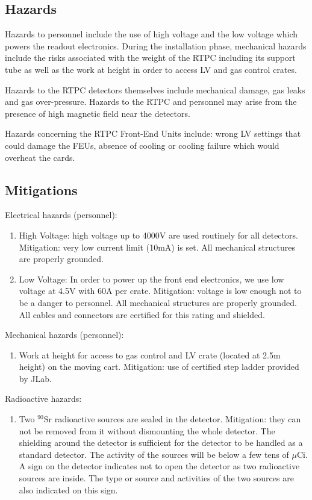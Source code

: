 \subsection{Hazards} 

Hazards to personnel include the use of high voltage and the low voltage which powers the readout electronics. During the installation phase, mechanical hazards include the risks associated with the weight of the RTPC including its support tube as well as the work at height in order to access LV and gas control crates.

Hazards to the RTPC detectors themselves include mechanical damage, gas leaks and gas over-pressure. Hazards to the RTPC and personnel may arise from the presence of high magnetic field near the detectors.

Hazards concerning the RTPC Front-End Units include: wrong LV settings that could damage the FEUs, absence of cooling or cooling failure which would overheat the cards.

\subsection{Mitigations}

Electrical hazards (personnel):

\begin{enumerate}
\item High Voltage: high voltage up to 4000V are used routinely for all detectors. Mitigation: very low current limit (10mA) is set. All mechanical structures are properly grounded.
\item Low Voltage: In order to power up the front end electronics, we use low voltage at 4.5V with 60A per crate. Mitigation: voltage is low enough not to be a danger to personnel. All mechanical structures are properly grounded. All cables and connectors are certified for this rating and shielded.
\end{enumerate}

Mechanical hazards (personnel):
\begin{enumerate}
\item	Work at height for access to gas control and LV crate (located at 2.5m height) on the moving cart. Mitigation: use of certified step ladder provided by JLab.
\end{enumerate}


Radioactive hazards:
\begin{enumerate}
\item Two $^{90}$Sr radioactive sources are sealed in the detector. Mitigation: they can not be removed from it without dismounting the whole detector. The shielding around the detector is sufficient for the detector to be handled as a standard detector. The activity of the sources will be below a few tens of $\mu$Ci. A sign on the detector indicates not to open the detector as two radioactive sources are inside. The type or source and activities of the two sources are also indicated on this sign.
\end{enumerate}


